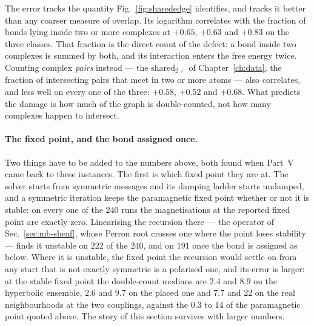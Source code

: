 The error tracks the quantity Fig.~\ref{fig:sharededge} identifies, and tracks
it better than any coarser measure of overlap. Its logarithm correlates with the
fraction of bonds lying inside two or more complexes at $+0.65$, $+0.63$ and
$+0.83$ on the three classes. That fraction is the direct count of the defect:
a bond inside two complexes is summed by both, and its interaction enters the
free energy twice. Counting complex \emph{pairs} instead --- the
$\mathrm{shared}_{2+}$ of Chapter~\ref{ch:data}, the fraction of intersecting
pairs that meet in two or more atoms --- also correlates, and less well on every
one of the three: $+0.58$, $+0.52$ and $+0.68$. What predicts the damage is how
much of the graph is double-counted, not how many complexes happen to intersect.

\paragraph{The fixed point, and the bond assigned once.} Two things
have to be added to the numbers above, both found when Part~V came back
to these instances. The first is which fixed point they are at. The
solver starts from symmetric messages and its damping ladder starts
undamped, and a symmetric iteration keeps the paramagnetic fixed point
whether or not it is stable: on every one of the $240$ runs the
magnetisations at the reported fixed point are exactly zero. Linearising
the recursion there --- the operator of Sec.~\ref{sec:mb-sheaf}, whose
Perron root crosses one where the point loses stability --- finds it
unstable on $222$ of the $240$, and on $191$ once the bond is assigned as
below. Where it is unstable, the fixed point the recursion would settle
on from any start that is not exactly symmetric is a polarised one, and
its error is larger: at the stable fixed point the double-count medians
are $2.4$ and $8.9$ on the hyperbolic ensemble, $2.6$ and $9.7$ on the
placed one and $7.7$ and $22$ on the real neighbourhoods at the two
couplings, against the $0.3$ to $14$ of the paramagnetic point quoted
above. The story of this section survives with larger numbers.


